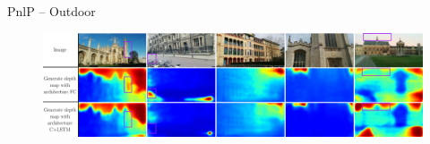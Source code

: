 \begin{frame}{PnlP -- Outdoor}
	\centering
	

	\vfill	
	
	\begin{figure}
		\includegraphics[width=\linewidth]{images/results/depth_map/fig2/fig2-wborder}
	\end{figure}

\end{frame}